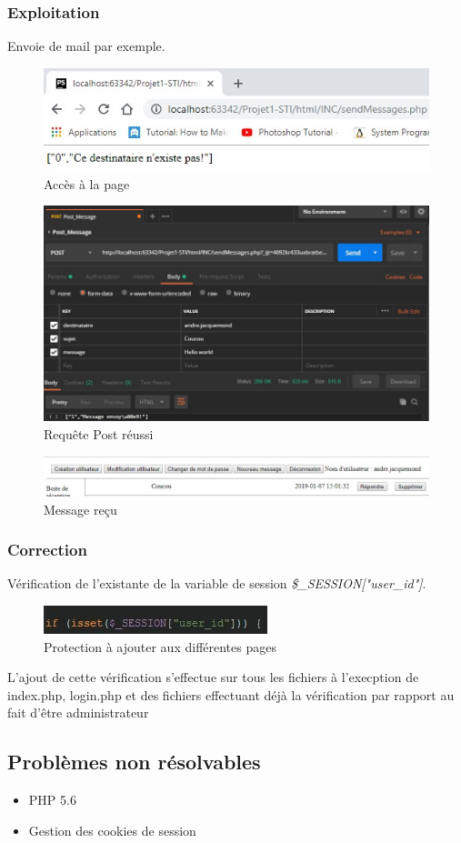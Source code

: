 \documentclass[12pt]{article}
\begin{document}
\subsubsection{Exploitation}
Envoie de mail par exemple.
\begin{figure}[H]
\centering
\includegraphics{images/withoutLogin.jpg}
\caption{Accès à la page}
\end{figure}
\begin{figure}[H]
\centering
\includegraphics[width=\linewidth]{images/postmanSendMessage.jpg}
\caption{Requête Post réussi}
\end{figure}
\begin{figure}[H]
\centering
\includegraphics{images/postmanSendMessageSuccess.jpg}
\caption{Message reçu}
\end{figure}

\subsubsection{Correction}
Vérification de l'existante de la variable de session \textit{\$\_SESSION["user\_id"]}. 
\begin{figure}[H]
\centering
\includegraphics{images/protectionPage.jpg}
\caption{Protection à ajouter aux différentes pages}
\end{figure}
L'ajout de cette vérification s'effectue sur tous les fichiers à l'execption de index.php, login.php et des fichiers effectuant déjà la vérification par rapport au fait d'être administrateur


\subsection{Problèmes non résolvables}
\begin{itemize}
\item PHP 5.6
\item Gestion des cookies de session
\end{itemize}
\end{document}
